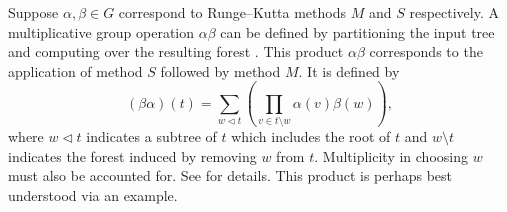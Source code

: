 Suppose $\alpha, \beta \in G$ correspond to Runge--Kutta methods $M$ and $S$ respectively.
A multiplicative group operation $\alpha\beta$ can be defined
by partitioning the input tree and
computing over the resulting forest \cite{Butcher2008_book}.
This product $\alpha\beta$ corresponds to the application
of method $S$ followed by method $M$.
It is defined by
\begin{equation}\label{eq:Group_operation}
  (\beta\alpha)(t) = \sum_{w \lhd t} \left(\prod_{v \in t \setminus w} \alpha(v)\beta(w)\right),
\end{equation}
where $w \lhd t$ indicates a subtree of $t$ which includes the
root of $t$ and $w \setminus t$ indicates the forest induced
by removing $w$ from $t$.
Multiplicity in choosing $w$ must also be accounted for.
See \cite{Butcher2008_book} for details.
This product is perhaps best understood via an example.


